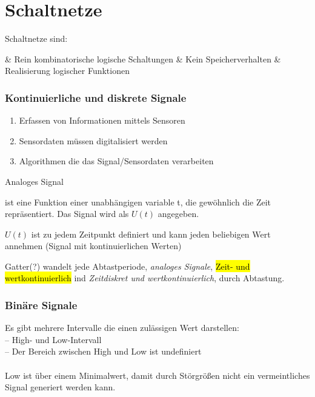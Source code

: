 \documentclass[a4paper]{scrartcl}
\begin{document}
	\section{Schaltnetze}
		
			Schaltnetze sind:
			\begin{easylist}
				& Rein kombinatorische logische Schaltungen
				& Kein Speicherverhalten
				& Realisierung logischer Funktionen
			\end{easylist}
		
			\subsubsection{Kontinuierliche und diskrete Signale}
				\begin{enumerate}
					\item Erfassen von Informationen mittels Sensoren
					\item Sensordaten müssen digitalisiert werden
					\item Algorithmen die das Signal/Sensordaten verarbeiten
				\end{enumerate}
			
				\begin{labeling}{Analoges Signal}
					\item[Ein Signal] ist eine Funktion einer unabhängigen variable t, die gewöhnlich die Zeit repräsentiert. Das Signal wird als \(U(t)\) angegeben.
					\item[Analoges Signal] \( U(t) \) ist zu jedem Zeitpunkt definiert und kann jeden beliebigen Wert annehmen (Signal mit kontinuierlichen Werten)
				\end{labeling}
				
				Gatter(?) wandelt jede Abtastperiode, \emph{analoges Signale}, \hl{Zeit- und wertkontinuierlich} ind \emph{Zeitdiskret und wertkontinuierlich}, durch Abtastung.\\
			
			\subsubsection{Binäre Signale}
				Es gibt mehrere Intervalle die einen zulässigen Wert darstellen:\\
				-- High- und Low-Intervall\\
				-- Der Bereich zwischen High und Low ist undefiniert\\
				\\
				Low ist über einem Minimalwert, damit durch Störgrößen nicht ein vermeintliches Signal generiert werden kann.
				
\end{document}
